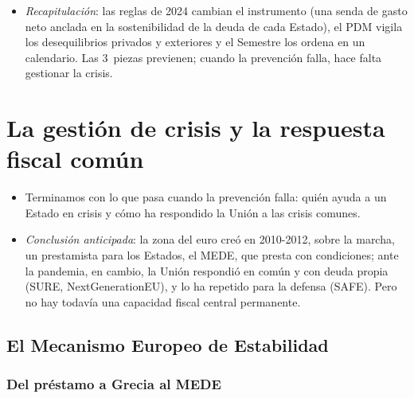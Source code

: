 \documentclass[11pt]{article}
\begin{document}
\begin{infografia}[H]
\centering
\caption{El ciclo anual del Semestre Europeo}\label{figu:semestre}
\end{infografia}

\begin{itemize}
\item \emph{Recapitulación}: las reglas de 2024 cambian el instrumento (una senda de gasto neto anclada en la sostenibilidad de la deuda de cada Estado), el PDM vigila los desequilibrios privados y exteriores y el Semestre los ordena en un calendario. Las 3~piezas previenen; cuando la prevención falla, hace falta gestionar la crisis.
\end{itemize}

\section{La gestión de crisis y la respuesta fiscal común}\label{sec:crisis}

\begin{itemize}
\item Terminamos con lo que pasa cuando la prevención falla: quién ayuda a un Estado en crisis y cómo ha respondido la Unión a las crisis comunes.
\item \emph{Conclusión anticipada}: la zona del euro creó en 2010-2012, sobre la marcha, un prestamista para los Estados, el MEDE, que presta con condiciones; ante la pandemia, en cambio, la Unión respondió en común y con deuda propia (SURE, NextGenerationEU), y lo ha repetido para la defensa (SAFE). Pero no hay todavía una capacidad fiscal central permanente.
\end{itemize}

\subsection{El Mecanismo Europeo de Estabilidad}\label{sec:mede}

\subsubsection{Del préstamo a Grecia al MEDE}\label{sec:mede-origen}
\end{document}
